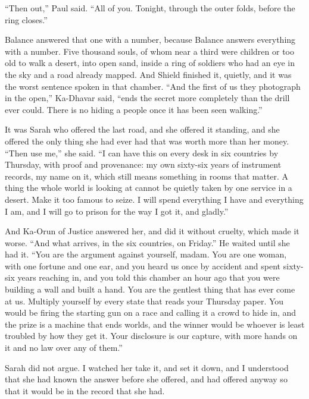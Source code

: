 ``Then out,'' Paul said. ``All of you. Tonight, through the outer folds, before the ring closes.''\par

Balance answered that one with a number, because Balance answers everything with a number. Five thousand souls, of whom near a third were children or too old to walk a desert, into open sand, inside a ring of soldiers who had an eye in the sky and a road already mapped. And Shield finished it, quietly, and it was the worst sentence spoken in that chamber. ``And the first of us they photograph in the open,'' Ka-Dhavar said, ``ends the secret more completely than the drill ever could. There is no hiding a people once it has been seen walking.''\par

It was Sarah who offered the last road, and she offered it standing, and she offered the only thing she had ever had that was worth more than her money. ``Then use me,'' she said. ``I can have this on every desk in six countries by Thursday, with proof and provenance: my own sixty-six years of instrument records, my name on it, which still means something in rooms that matter. A thing the whole world is looking at cannot be quietly taken by one service in a desert. Make it too famous to seize. I will spend everything I have and everything I am, and I will go to prison for the way I got it, and gladly.''\par

And Ka-Orun of Justice answered her, and did it without cruelty, which made it worse. ``And what arrives, in the six countries, on Friday.'' He waited until she had it. ``You are the argument against yourself, madam. You are one woman, with one fortune and one ear, and you heard us once by accident and spent sixty-six years reaching in, and you told this chamber an hour ago that you were building a wall and built a hand. You are the gentlest thing that has ever come at us. Multiply yourself by every state that reads your Thursday paper. You would be firing the starting gun on a race and calling it a crowd to hide in, and the prize is a machine that ends worlds, and the winner would be whoever is least troubled by how they get it. Your disclosure is our capture, with more hands on it and no law over any of them.''\par

Sarah did not argue. I watched her take it, and set it down, and I understood that she had known the answer before she offered, and had offered anyway so that it would be in the record that she had.\par

